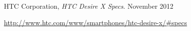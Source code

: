 \begin{thebibliography}{9}
		HTC Corporation,
		\emph{HTC Desire X Specs}.
		November 2012

		\url{http://www.htc.com/www/smartphones/htc-desire-x/#specs}
\end{thebibliography}
